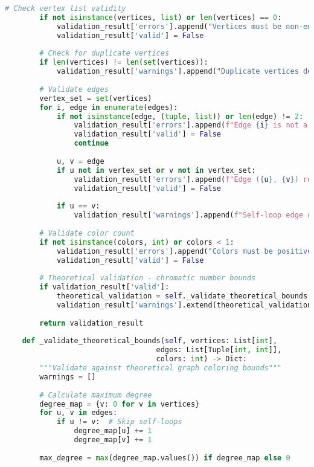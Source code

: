 \begin{lstlisting}[language=Python, caption=Test Case Validation and Verification]
        # Check vertex list validity
        if not isinstance(vertices, list) or len(vertices) == 0:
            validation_result['errors'].append("Vertices must be non-empty list")
            validation_result['valid'] = False
        
        # Check for duplicate vertices
        if len(vertices) != len(set(vertices)):
            validation_result['warnings'].append("Duplicate vertices detected")
        
        # Validate edges
        vertex_set = set(vertices)
        for i, edge in enumerate(edges):
            if not isinstance(edge, (tuple, list)) or len(edge) != 2:
                validation_result['errors'].append(f"Edge {i} is not a valid pair")
                validation_result['valid'] = False
                continue
            
            u, v = edge
            if u not in vertex_set or v not in vertex_set:
                validation_result['errors'].append(f"Edge ({u}, {v}) references invalid vertex")
                validation_result['valid'] = False
            
            if u == v:
                validation_result['warnings'].append(f"Self-loop edge detected: ({u}, {v})")
        
        # Validate color count
        if not isinstance(colors, int) or colors < 1:
            validation_result['errors'].append("Colors must be positive integer")
            validation_result['valid'] = False
        
        # Theoretical validation - chromatic number bounds
        if validation_result['valid']:
            theoretical_validation = self._validate_theoretical_bounds(vertices, edges, colors)
            validation_result['warnings'].extend(theoretical_validation.get('warnings', []))
        
        return validation_result
    
    def _validate_theoretical_bounds(self, vertices: List[int], 
                                   edges: List[Tuple[int, int]], 
                                   colors: int) -> Dict:
        """Validate against theoretical graph coloring bounds"""
        warnings = []
        
        # Calculate maximum degree
        degree_map = {v: 0 for v in vertices}
        for u, v in edges:
            if u != v:  # Skip self-loops
                degree_map[u] += 1
                degree_map[v] += 1
        
        max_degree = max(degree_map.values()) if degree_map else 0
        

\end{lstlisting}

